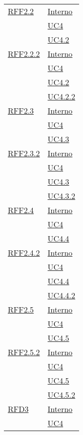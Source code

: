 \begin{longtable}{|>{\centering}m{5cm}|m{5cm}<{\centering}|}
\hyperlink{RFF2.2}{RFF2.2} 
& \hyperlink{Interno}{Interno}\\
& \hyperref[UC4]{UC4}\\
& \hyperref[UC4.2]{UC4.2}\\ \hline

\hyperlink{RFF2.2.2}{RFF2.2.2} 
& \hyperlink{Interno}{Interno}\\
& \hyperref[UC4]{UC4}\\
& \hyperref[UC4.2]{UC4.2}\\
& \hyperref[UC4.2.2]{UC4.2.2}\\ \hline

\hyperlink{RFF2.3}{RFF2.3} 
& \hyperlink{Interno}{Interno}\\
& \hyperref[UC4]{UC4}\\
& \hyperref[UC4.3]{UC4.3}\\ \hline

\hyperlink{RFF2.3.2}{RFF2.3.2} 
& \hyperlink{Interno}{Interno}\\
& \hyperref[UC4]{UC4}\\
& \hyperref[UC4.3]{UC4.3}\\
& \hyperref[UC4.3.2]{UC4.3.2}\\ \hline

\hyperlink{RFF2.4}{RFF2.4}
& \hyperlink{Interno}{Interno}\\
& \hyperref[UC4]{UC4}\\
& \hyperref[UC4.4]{UC4.4}\\ \hline

\hyperlink{RFF2.4.2}{RFF2.4.2} 
& \hyperlink{Interno}{Interno}\\
& \hyperref[UC4]{UC4}\\
& \hyperref[UC4.4]{UC4.4}\\
& \hyperref[UC4.4.2]{UC4.4.2}\\ \hline

\hyperlink{RFF2.5}{RFF2.5} 
& \hyperlink{Interno}{Interno}\\
& \hyperref[UC4]{UC4}\\
& \hyperref[UC4.5]{UC4.5}\\ \hline

\hyperlink{RFF2.5.2}{RFF2.5.2} 
& \hyperlink{Interno}{Interno}\\
& \hyperref[UC4]{UC4}\\
& \hyperref[UC4.5]{UC4.5}\\
& \hyperref[UC4.5.2]{UC4.5.2}\\ \hline

\hyperlink{RFD3}{RFD3} 
& \hyperlink{Interno}{Interno}\\
& \hyperref[UC4]{UC4}\\ \hline


\end{longtable}
